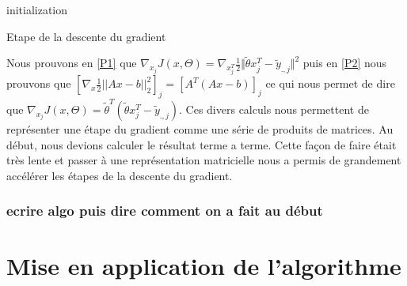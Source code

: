 \documentclass[a4paper,10pt]{article}
\begin{document}
\begin{algorithm}[H]
 initialization\;
 
 \caption{Etape de la descente du gradient}
\end{algorithm}
Nous prouvons en \ref{P1} que $ \nabla_{x_{j}}J(x, \Theta) = \nabla_{x_{j}^T}\frac{1}{2}\Vert\tilde{\theta}x_{j}^{T}-\tilde{y}_{.,j}\Vert^{2}$
puis en \ref{P2} nous prouvons que $[\nabla_{x} \frac{1}{2}||Ax - b||^{2}_{2}]_{j} = [A^{T}(Ax - b)]_{j}$ ce qui nous permet de dire
que $ \nabla_{x_{j}}J(x, \Theta) =  \tilde{\theta}^{T}(\tilde{\theta}x_{j}^{T}-\tilde{y}_{.,j})$. Ces divers calculs nous permettent
de représenter une étape du gradient comme une série de produits de matrices. Au début, nous devions calculer le résultat terme a terme. Cette
façon de faire était très lente et passer à une représentation matricielle nous a permis de grandement accélérer les étapes de la descente du gradient.
\subsubsection{ecrire algo puis dire comment on a fait au début}
\section{Mise en application de l'algorithme}
\end{document}
